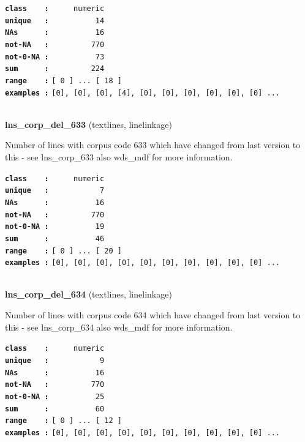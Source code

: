 \documentclass[]{article}
\begin{document}
\textbf{\texttt{class\ \ \ \ :}} \texttt{~~~~~numeric}\\
\textbf{\texttt{unique\ \ \ :}} \texttt{~~~~~~~~~~14}\\
\textbf{\texttt{NAs\ \ \ \ \ \ :}} \texttt{~~~~~~~~~~16}\\
\textbf{\texttt{not-NA\ \ \ :}} \texttt{~~~~~~~~~770}\\
\textbf{\texttt{not-0-NA\ :}} \texttt{~~~~~~~~~~73}\\
\textbf{\texttt{sum\ \ \ \ \ \ :}} \texttt{~~~~~~~~~224}\\
\textbf{\texttt{range\ \ \ \ :}}
\texttt{{[}\ 0\ {]}\ ...\ {[}\ 18\ {]}}\\
\textbf{\texttt{examples\ :}}
\texttt{{[}0{]},\ {[}0{]},\ {[}0{]},\ {[}4{]},\ {[}0{]},\ {[}0{]},\ {[}0{]},\ {[}0{]},\ {[}0{]},\ {[}0{]}\ ...}\\

~

\textbf{lns\_corp\_del\_633} (textlines, linelinkage)

Number of lines with corpus code 633 which have changed from last
version to this - see lns\_corp\_633 also wds\_mdf for more information.

\textbf{\texttt{class\ \ \ \ :}} \texttt{~~~~~numeric}\\
\textbf{\texttt{unique\ \ \ :}} \texttt{~~~~~~~~~~~7}\\
\textbf{\texttt{NAs\ \ \ \ \ \ :}} \texttt{~~~~~~~~~~16}\\
\textbf{\texttt{not-NA\ \ \ :}} \texttt{~~~~~~~~~770}\\
\textbf{\texttt{not-0-NA\ :}} \texttt{~~~~~~~~~~19}\\
\textbf{\texttt{sum\ \ \ \ \ \ :}} \texttt{~~~~~~~~~~46}\\
\textbf{\texttt{range\ \ \ \ :}}
\texttt{{[}\ 0\ {]}\ ...\ {[}\ 20\ {]}}\\
\textbf{\texttt{examples\ :}}
\texttt{{[}0{]},\ {[}0{]},\ {[}0{]},\ {[}0{]},\ {[}0{]},\ {[}0{]},\ {[}0{]},\ {[}0{]},\ {[}0{]},\ {[}0{]}\ ...}\\

~

\textbf{lns\_corp\_del\_634} (textlines, linelinkage)

Number of lines with corpus code 634 which have changed from last
version to this - see lns\_corp\_634 also wds\_mdf for more information.

\textbf{\texttt{class\ \ \ \ :}} \texttt{~~~~~numeric}\\
\textbf{\texttt{unique\ \ \ :}} \texttt{~~~~~~~~~~~9}\\
\textbf{\texttt{NAs\ \ \ \ \ \ :}} \texttt{~~~~~~~~~~16}\\
\textbf{\texttt{not-NA\ \ \ :}} \texttt{~~~~~~~~~770}\\
\textbf{\texttt{not-0-NA\ :}} \texttt{~~~~~~~~~~25}\\
\textbf{\texttt{sum\ \ \ \ \ \ :}} \texttt{~~~~~~~~~~60}\\
\textbf{\texttt{range\ \ \ \ :}}
\texttt{{[}\ 0\ {]}\ ...\ {[}\ 12\ {]}}\\
\textbf{\texttt{examples\ :}}
\texttt{{[}0{]},\ {[}0{]},\ {[}0{]},\ {[}0{]},\ {[}0{]},\ {[}0{]},\ {[}0{]},\ {[}0{]},\ {[}0{]},\ {[}0{]}\ ...}\\
\end{document}
